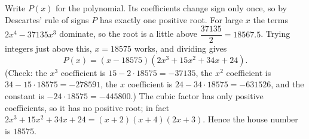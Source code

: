 Write $P(x)$ for the polynomial. Its coefficients change sign only once, so by Descartes' rule of signs $P$ has exactly one positive root. For large $x$ the terms $2x^4-37135x^3$ dominate, so the root is a little above $\dfrac{37135}{2}=18567.5$. Trying integers just above this, $x=18575$ works, and dividing gives
\[
P(x)=(x-18575)\left(2x^3+15x^2+34x+24\right).
\]
(Check: the $x^3$ coefficient is $15-2\cdot18575=-37135$, the $x^2$ coefficient is $34-15\cdot18575=-278591$, the $x$ coefficient is $24-34\cdot18575=-631526$, and the constant is $-24\cdot18575=-445800$.) The cubic factor has only positive coefficients, so it has no positive root; in fact $2x^3+15x^2+34x+24=(x+2)(x+4)(2x+3)$. Hence the house number is $\boxed{18575}$.
